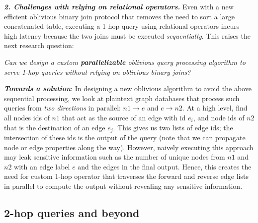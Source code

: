 \vspace{0.7em}
\noindent\textit{\textbf{2. Challenges with relying on relational operators.}} 
Even with a new efficient oblivious binary join protocol that removes the need
to sort a large concatenated table, executing a 1-hop query using relational
operators incurs high latency because the two joins must be executed \textit{sequentially}.
This raises the next research question:

\begin{tcolorbox}[colback=gray!7!white,coltitle=black,colframe=orange!50!white,title=\centering \textbf{Research question 2}]
\centering
\emph{Can we design a custom \textbf{parallelizable} oblivious query processing algorithm to serve 1-hop queries without relying on oblivious binary joins?}
\end{tcolorbox}

\noindent\textit{\textbf{Towards a solution}}: In designing a new oblivious algorithm
to avoid the above sequential processing, we look at plaintext graph databases
that process such queries from \textit{two directions} in parallel: $n1\rightarrow e$
and $e \rightarrow n2$. At a high level, find all nodes ids
of $n1$ that act as the source of an edge with id $e_i$, and node ids of $n2$ that
is the destination of an edge $e_j$. This gives us two lists of edge ids; the 
intersection of these ids is the output of the query (note that we can propagate node
or edge properties along the way). However, naively executing this approach may leak 
sensitive information such as
the number of unique nodes from $n1$ and $n2$ with an edge label $e$ and the edges in the final output. Hence, this creates the need for custom 1-hop operator 
that traverses the forward and reverse edge lists in parallel to compute the output 
without revealing any sensitive information.

\vspace{-0.7em}
\subsection{2-hop queries and beyond}

